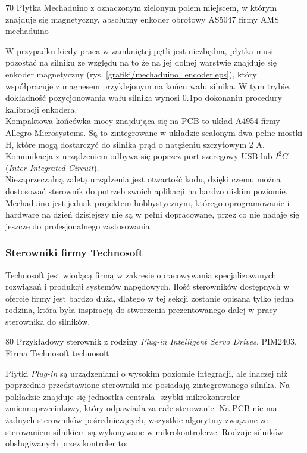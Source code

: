 	{70}
	{Płytka Mechaduino z oznaczonym zielonym polem miejscem, w którym znajduje się magnetyczny, absolutny enkoder obrotowy AS5047 firmy AMS}
	{mechaduino}
	
W przypadku kiedy praca w zamkniętej pętli jest niezbędna, płytka musi pozostać na silniku ze względu na to że na jej dolnej warstwie znajduje się enkoder magnetyczny (rys. \ref{grafiki/mechaduino_encoder.eps}), który współpracuje z magnesem przyklejonym na końcu wału silnika. W tym trybie, dokładność pozycjonowania wału silnika wynosi 0.1\degree po dokonaniu procedury kalibracji enkodera. \\

Kompaktowa końcówka mocy znajdująca się na PCB to układ A4954 firmy Allegro Microsystems. Są to zintegrowane w układzie scalonym dwa pełne mostki H, które mogą dostarczyć do silnika prąd o natężeniu szczytowym 2 A. Komunikacja z urządzeniem odbywa się poprzez port szeregowy USB lub $ I^2C $ ({\it Inter-Integrated Circuit}). \\

Niezaprzeczalną zaletą urządzenia jest otwartość kodu, dzięki czemu można dostosować sterownik do potrzeb swoich aplikacji na bardzo niskim poziomie. Mechaduino jest jednak projektem hobbystycznym, którego oprogramowanie i hardware  na dzień dzisiejszy nie są w pełni dopracowane, przez co nie nadaje się jeszcze do profesjonalnego zastosowania.

\subsubsection{Sterowniki firmy Technosoft}
\label{technosoft}

Technosoft jest wiodącą firmą w zakresie opracowywania specjalizowanych rozwiązań i produkcji systemów napędowych. Ilość sterowników dostępnych w ofercie firmy jest bardzo duża, dlatego w tej sekcji zostanie opisana tylko jedna rodzina, która była inspiracją do stworzenia prezentowanego dalej w pracy sterownika do silników.

	{80}
	{Przykładowy sterownik z rodziny {\it Plug-in Intelligent Servo Drives}, PIM2403. Firma Technosoft}
	{technosoft}
	
Płytki {\it Plug-in} są urządzeniami o wysokim poziomie integracji, ale inaczej niż poprzednio przedstawione sterowniki nie posiadają zintegrowanego silnika. Na pokładzie znajduje się jednostka centrala- szybki mikrokontroler zmiennoprzecinkowy, który odpawiada za całe sterowanie. Na PCB nie ma żadnych sterowników pośredniczących, wszystkie algorytmy związane ze sterowaniem silnikiem są wykonywane w mikrokontrolerze. Rodzaje silników obsługiwanych przez kontroler to:

